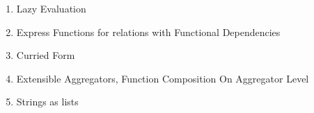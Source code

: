 \begin{enumerate}
\item Lazy Evaluation
\item Express Functions for relations with Functional Dependencies
\item Curried Form
\item Extensible Aggregators, Function Composition On Aggregator Level
\item Strings as lists
\end{enumerate}
